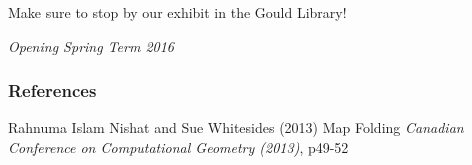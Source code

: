 \documentclass{beamer}
\begin{document}
\begin{frame}
\begin{center}
\Huge{Make sure to stop by our exhibit in the Gould Library!}
\end{center}
\Large{\centerline{\emph{Opening Spring Term 2016}}}
\end{frame}





\begin{frame}
\frametitle{References}
\footnotesize{
\begin{thebibliography}{99} %



 Rahnuma Islam Nishat and Sue Whitesides (2013)
\newblock Map Folding
\newblock \emph{Canadian Conference on Computational Geometry (2013)}, p49-52

\end{thebibliography}
}
\end{frame}



\end{document}
